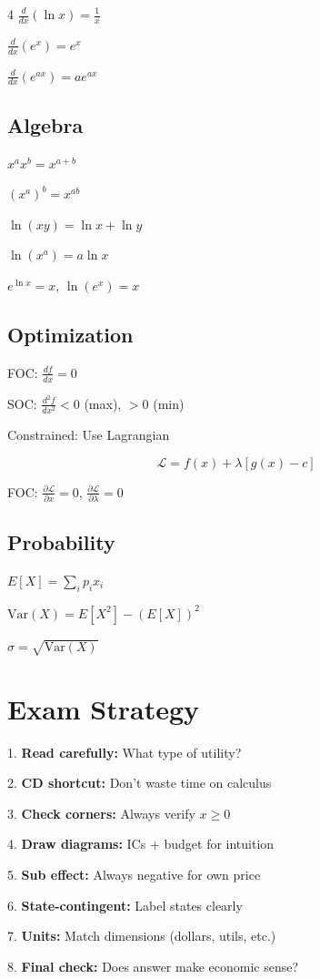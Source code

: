 \documentclass[8pt,landscape]{article}
\begin{document}
\begin{multicols}{4}
$\frac{d}{dx}(\ln x) = \frac{1}{x}$

$\frac{d}{dx}(e^x) = e^x$

$\frac{d}{dx}(e^{ax}) = ae^{ax}$

\subsection{Algebra}
$x^a x^b = x^{a+b}$

$(x^a)^b = x^{ab}$

$\ln(xy) = \ln x + \ln y$

$\ln(x^a) = a \ln x$

$e^{\ln x} = x$, $\ln(e^x) = x$

\subsection{Optimization}
FOC: $\frac{df}{dx} = 0$

SOC: $\frac{d^2f}{dx^2} < 0$ (max), $> 0$ (min)

Constrained: Use Lagrangian

$$\mathcal{L} = f(x) + \lambda[g(x) - c]$$

FOC: $\frac{\partial \mathcal{L}}{\partial x} = 0$, $\frac{\partial \mathcal{L}}{\partial \lambda} = 0$

\subsection{Probability}
$E[X] = \sum_i p_i x_i$

$\text{Var}(X) = E[X^2] - (E[X])^2$

$\sigma = \sqrt{\text{Var}(X)}$

\section{Exam Strategy}

1. \textbf{Read carefully:} What type of utility?

2. \textbf{CD shortcut:} Don't waste time on calculus

3. \textbf{Check corners:} Always verify $x \geq 0$

4. \textbf{Draw diagrams:} ICs + budget for intuition

5. \textbf{Sub effect:} Always negative for own price

6. \textbf{State-contingent:} Label states clearly

7. \textbf{Units:} Match dimensions (dollars, utils, etc.)

8. \textbf{Final check:} Does answer make economic sense?

\end{multicols}
\end{document}
